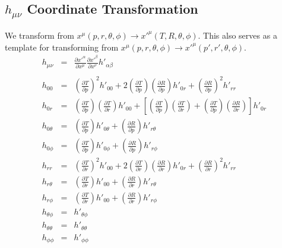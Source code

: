 \documentclass[10pt,letterpaper]{article}
\numberwithin{equation}{section}
\begin{document}
\begin{appendices}
	\section{$h_{\mu\nu}$ Coordinate Transformation}
	We transform from $x^\mu (p,r,\theta,\phi) \to x'^\mu (T,R,\theta,\phi)$. This also serves as a template for transforming from $x^\mu (p,r,\theta,\phi) \to x'^\mu (p',r',\theta,\phi)$.
	\begin{eqnarray}
	h_{\mu\nu} &=& \frac{\partial x'^\alpha}{\partial x^\mu }\frac{\partial x'^\beta}{\partial x^\nu} h'_{\alpha\beta}
	\\ \nonumber\\
	h_{00} &=& \left( \frac{\partial T}{\partial p}\right)^2 h'_{00} + 2 \left(\frac{\partial T}{\partial p}\right)\left(\frac{\partial R}{\partial p}\right) h'_{0r} + \left(\frac{\partial R}{\partial p}\right)^2 h'_{rr}
	\nonumber\\
	h_{0r} &=& \left( \frac{\partial T}{\partial p}\right)\left( \frac{\partial T}{\partial r}\right)h'_{00} + \left[\left( \frac{\partial T}{\partial p}\right)\left( \frac{\partial T}{\partial r}\right)+\left( \frac{\partial T}{\partial p}\right)\left( \frac{\partial R}{\partial r}\right)\right]h'_{0r}
	\nonumber\\
	h_{0\theta} &=& \left( \frac{\partial T}{\partial p}\right)h'_{0\theta} + \left( \frac{\partial R}{\partial p}\right)h'_{r\theta}
	\nonumber\\
	h_{0\phi} &=& \left( \frac{\partial T}{\partial p}\right)h'_{0\phi} + \left( \frac{\partial R}{\partial p}\right)h'_{r\phi}
	\nonumber\\
	h_{rr} &=& \left( \frac{\partial T}{\partial r}\right)^2 h'_{00} + 2\left( \frac{\partial T}{\partial r}\right)\left( \frac{\partial R}{\partial r}\right)h'_{0r} + \left( \frac{\partial R}{\partial r}\right)^2 h'_{rr}
	\nonumber\\
	h_{r\theta} &=& \left( \frac{\partial T}{\partial r}\right)h'_{00} + \left( \frac{\partial R}{\partial r}\right)h'_{r\theta}
	\nonumber\\
	h_{r\phi} &=& \left( \frac{\partial T}{\partial r}\right)h'_{00} + \left( \frac{\partial R}{\partial r}\right)h'_{r\phi}
	\nonumber\\
	h_{\theta\phi} &=& h'_{\theta\phi}
	\nonumber\\
	h_{\theta\theta} &=& h'_{\theta\theta}
	\nonumber\\
	h_{\phi\phi} &=& h'_{\phi\phi}
	\label{htrans}
	\end{eqnarray}
\end{appendices}
\end{document}
